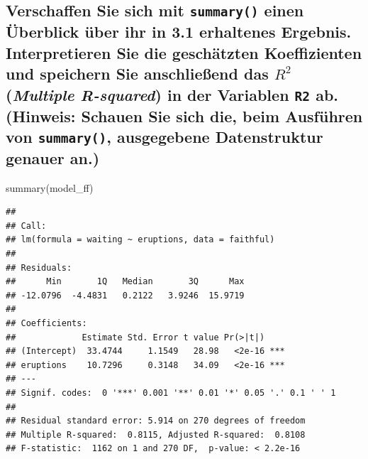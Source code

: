 \documentclass[12pt,a4paper]{article}
\newenvironment{Shaded}{\begin{snugshade}}{\end{snugshade}}
\newcommand{\FunctionTok}[1]{\textcolor[rgb]{0.00,0.00,0.00}{#1}}
\newcommand{\NormalTok}[1]{#1}
\begin{document}
\hypertarget{verschaffen-sie-sich-mit-summary-einen-uxfcberblick-uxfcber-ihr-in-3.1-erhaltenes-ergebnis.-interpretieren-sie-die-geschuxe4tzten-koeffizienten-und-speichern-sie-anschlieuxdfend-das-r2-multiple-r-squared-in-der-variablen-r2-ab.-hinweis-schauen-sie-sich-die-beim-ausfuxfchren-von-summary-ausgegebene-datenstruktur-genauer-an.}{%
\subsection{\texorpdfstring{Verschaffen Sie sich mit \texttt{summary()}
einen Überblick über ihr in 3.1 erhaltenes Ergebnis. Interpretieren Sie
die geschätzten Koeffizienten und speichern Sie anschließend das \(R^2\)
(\emph{Multiple R-squared}) in der Variablen \texttt{R2} ab. (Hinweis:
Schauen Sie sich die, beim Ausführen von \texttt{summary()}, ausgegebene
Datenstruktur genauer
an.)}{Verschaffen Sie sich mit summary() einen Überblick über ihr in 3.1 erhaltenes Ergebnis. Interpretieren Sie die geschätzten Koeffizienten und speichern Sie anschließend das R\^{}2 (Multiple R-squared) in der Variablen R2 ab. (Hinweis: Schauen Sie sich die, beim Ausführen von summary(), ausgegebene Datenstruktur genauer an.)}}\label{verschaffen-sie-sich-mit-summary-einen-uxfcberblick-uxfcber-ihr-in-3.1-erhaltenes-ergebnis.-interpretieren-sie-die-geschuxe4tzten-koeffizienten-und-speichern-sie-anschlieuxdfend-das-r2-multiple-r-squared-in-der-variablen-r2-ab.-hinweis-schauen-sie-sich-die-beim-ausfuxfchren-von-summary-ausgegebene-datenstruktur-genauer-an.}}

\begin{Shaded}
\begin{Highlighting}[]
    \FunctionTok{summary}\NormalTok{(model\_ff)}
\end{Highlighting}
\end{Shaded}

\begin{verbatim}
## 
## Call:
## lm(formula = waiting ~ eruptions, data = faithful)
## 
## Residuals:
##      Min       1Q   Median       3Q      Max 
## -12.0796  -4.4831   0.2122   3.9246  15.9719 
## 
## Coefficients:
##             Estimate Std. Error t value Pr(>|t|)    
## (Intercept)  33.4744     1.1549   28.98   <2e-16 ***
## eruptions    10.7296     0.3148   34.09   <2e-16 ***
## ---
## Signif. codes:  0 '***' 0.001 '**' 0.01 '*' 0.05 '.' 0.1 ' ' 1
## 
## Residual standard error: 5.914 on 270 degrees of freedom
## Multiple R-squared:  0.8115, Adjusted R-squared:  0.8108 
## F-statistic:  1162 on 1 and 270 DF,  p-value: < 2.2e-16
\end{verbatim}
\end{document}
